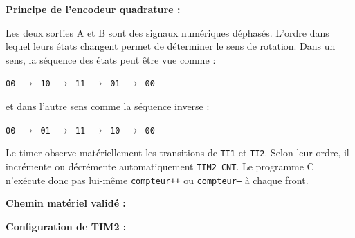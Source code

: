 \documentclass[11pt,a4paper]{article}
\begin{document}
\begin{sessionbox}
		\vspace{0.3cm}
		
		\textbf{Principe de l'encodeur quadrature :}
		
		Les deux sorties A et B sont des signaux numériques déphasés. L'ordre dans lequel leurs états changent permet de déterminer le sens de rotation. Dans un sens, la séquence des états peut être vue comme :
		
		\begin{center}
			\texttt{00 $\rightarrow$ 10 $\rightarrow$ 11 $\rightarrow$ 01 $\rightarrow$ 00}
		\end{center}
		
		et dans l'autre sens comme la séquence inverse :
		
		\begin{center}
			\texttt{00 $\rightarrow$ 01 $\rightarrow$ 11 $\rightarrow$ 10 $\rightarrow$ 00}
		\end{center}
		
		Le timer observe matériellement les transitions de \texttt{TI1} et \texttt{TI2}. Selon leur ordre, il incrémente ou décrémente automatiquement \texttt{TIM2\_CNT}. Le programme C n'exécute donc pas lui-même \texttt{compteur++} ou \texttt{compteur--} à chaque front.
		
		\vspace{0.3cm}
		
		\textbf{Chemin matériel validé :}
		
		\begin{center}
		\end{center}
		
		\vspace{0.3cm}
		
		\textbf{Configuration de TIM2 :}
		

\end{sessionbox}
\end{document}

